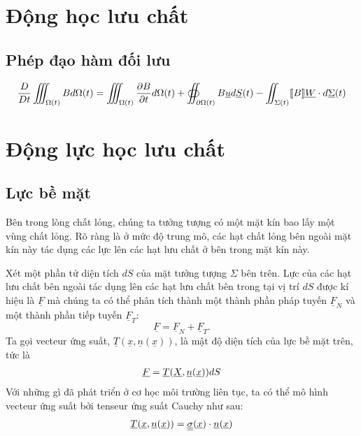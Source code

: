 \documentclass[CO_LUU_CHAT.tex]{subfiles}
\begin{document}
\section{Động học lưu chất}
\subsection{Phép đạo hàm đối lưu}

		\begin{align}
			\dfrac{D}{Dt}\iiint_{\Omega(t)}Bd\Omega(t)=\iiint_{\Omega(t)}\dfrac{\partial B}{\partial t}d\Omega(t)+\oiint_{\partial\Omega(t)}B\underline{u}d\underline{S}(t)-\iint_{\Sigma(t)}[\![ B ]\!]\underline{W}\cdot d\underline{\Sigma}(t)
		\end{align}


\section{Động lực học lưu chất}
\subsection{Lực bề mặt}

		Bên trong lòng chất lỏng, chúng ta tưởng tượng có một mặt kín bao lấy một vùng chất lỏng. Rõ ràng là ở mức độ trung mô, các hạt chất lỏng bên ngoài mặt kín này tác dụng các lực lên các hạt lưu chất ở bên trong mặt kín này.

		Xét một phần tử diện tích $dS$ của mặt tưởng tượng $\Sigma$ bên trên. Lực của các hạt lưu chất bên ngoài tác dụng lên các hạt lưu chất bên trong tại vị trí $dS$ được kí hiệu là $\underline{F}$ mà chúng ta có thể phân tích thành một thành phần pháp tuyến $\underline{F}_N$ và một thành phần tiếp tuyến $\underline{F}_T$:
		\[
			\underline{F}=\underline{F}_N+\underline{F}_T.
		\]
		Ta gọi vecteur ứng suất, $\underline T(\underline x,\underline n(\underline x))$, là mật độ diện tích của lực bề mặt trên, tức là
		\begin{align}
			\underline{F}=\underline{T}(\underline{X},\underline{n}(\underline{x}))dS
		\end{align}
		Với những gì đã phát triển ở cơ học môi trường liên tục, ta có thể mô hình vecteur ứng suất bởi tenseur ứng suất Cauchy như sau:
		\begin{align}
			\underline{T}(\underline{x},\underline{n} (\underline{x}))=\underline{\underline{\sigma}}(\underline{x})\cdot\underline{n}(\underline{x})
		\end{align}
		
\end{document}
